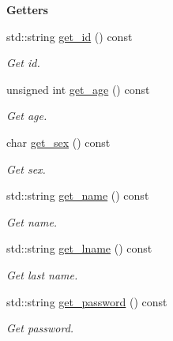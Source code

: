 \begin{Indent}{\bf Getters}\par
\begin{DoxyCompactItemize}
\item 
std\+::string \hyperlink{class_cuser_aa7af65946c11a2dafe58aa6f92f3e2b2}{get\+\_\+id} () const 
\begin{DoxyCompactList}\small\item\em Get id. \end{DoxyCompactList}\item 
unsigned int \hyperlink{class_cuser_a8611793c31edced138685b0d1989dc3c}{get\+\_\+age} () const 
\begin{DoxyCompactList}\small\item\em Get age. \end{DoxyCompactList}\item 
char \hyperlink{class_cuser_a1a29b4a09a6595ab755f888e0005c33c}{get\+\_\+sex} () const 
\begin{DoxyCompactList}\small\item\em Get sex. \end{DoxyCompactList}\item 
std\+::string \hyperlink{class_cuser_a34ee78b8655c4439528e1d63a5974683}{get\+\_\+name} () const 
\begin{DoxyCompactList}\small\item\em Get name. \end{DoxyCompactList}\item 
std\+::string \hyperlink{class_cuser_afa69506b9d0b6aa61a669c20e7e4862d}{get\+\_\+lname} () const 
\begin{DoxyCompactList}\small\item\em Get last name. \end{DoxyCompactList}\item 
std\+::string \hyperlink{class_cuser_ac5b9b699501987e6fc957366a81a1248}{get\+\_\+password} () const 
\begin{DoxyCompactList}\small\item\em Get password. \end{DoxyCompactList}\end{DoxyCompactItemize}
\end{Indent}
